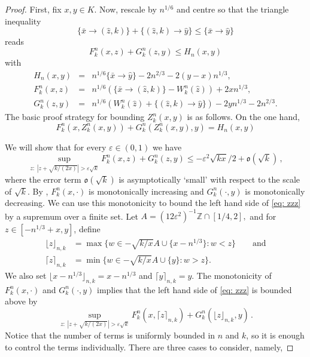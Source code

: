 \documentclass[11pt, reqno]{amsart}
\numberwithin{equation}{section}
\newcommand{\Z}{\ensuremath{\mathbb{Z}}}
\newcommand{\floor}[1]{\lfloor #1 \rfloor}
\newcommand{\ceil}[1]{\lceil #1 \rceil}
\begin{document}
\begin{proof}
First, fix $x,y\in K$. Now, rescale by $n^{1/6}$ and centre so that the triangle inequality
\begin{equation*}
\{\bar x \rightarrow (\hat z,k)\} + \{(\hat z,k)\rightarrow \hat y\} \le   \{\bar x\rightarrow \hat y \}
\end{equation*}
reads 
\begin{equation}\label{eq: triangle2}
F^n_k(x, z)+G^n_k(z, y)\le H_n(x, y) 
\end{equation}
with
\begin{eqnarray*}
H_n(x, y)&=&n^{1/6}\{\bar x\rightarrow \hat y \}-2n^{2/3}-2(y-x)n^{1/3}, \\
F^n_k(x, z) &=& n^{1/6}(\{\bar x \rightarrow (\hat z,k)\}-W^n_k(\hat z))+2xn^{1/3},
\\ G^n_k(z, y)&=&n^{1/6}(W^n_k(\hat z) + \{(\hat z,k )\rightarrow \hat y\})-2yn^{1/3}-2n^{2/3}.
\end{eqnarray*}
The basic proof strategy for bounding $Z^n_k(x, y)$ is as follows. On the one hand,
\begin{equation*}
F^n_k(x, Z^n_k(x, y)) + G^n_k(Z^n_k(x, y),y)=H_n(x, y)
\end{equation*}

We will show that for every $\varepsilon \in (0, 1)$ we have
\begin{equation}
\label{eq: zzz}
\sup_{z : \;|z+\sqrt{k/(2x)}|>\varepsilon \sqrt{k}} F^n_k(x, z)+G^n_k(z, y) \le -\varepsilon^2\sqrt{kx}/2 + \mathfrak{o}(\sqrt{k})\,,
\end{equation}
where the error term $\mathfrak{o}(\sqrt{k})$ is asymptotically `small' with respect to the scale of $\sqrt{k}$. By \cite[Lemma 3.3]{DOV},
$F^n_k(x, \cdot)$ is monotonically increasing and $G^n_k(\cdot, y)$ is monotonically decreasing. We can use this monotonicity to bound the left hand side of \eqref{eq: zzz} by a supremum over a finite set. 
 Let
$
A = (12\varepsilon^2)^{-1}\Z \cap [1/4, 2],
$
and for $z \in [-n^{1/3} + x, y]$, define 
\begin{equation*}
\label{eq: floorznk}
\begin{split}
    \floor{z}_{n, k} &= \max \{w \in -\sqrt{k/x}A \cup \{x - n^{1/3}\} : w < z\} \qquad \mathrm{and}\\
\ceil{z}_{n, k} &= \min \{w \in -\sqrt{k/x}A \cup \{y\} : w > z\}.
\end{split}
\end{equation*}
We also set $\lfloor x - n^{1/3}\rfloor_{n, k} = x - n^{1/3}$ and $\ceil{y}_{n, k} = y$. The monotonicity of $F^n_k(x, \cdot)$ and  $G^n_k(\cdot, y)$ implies that the left hand side of \eqref{eq: zzz} is bounded above by
\begin{equation}
\label{eq: with-part}
    \sup_{z : \;|z+\sqrt{k/(2x)}|>\varepsilon \sqrt{k}} F^n_k(x, \ceil{z}_{n, k})+G^n_k(\floor{z}_{n, k}, y)\,.
\end{equation}
Notice that the number of terms is uniformly bounded in $n$ and $k$, so it is enough to control the terms individually. There are three cases to consider, namely, 


\end{proof}
\end{document}
